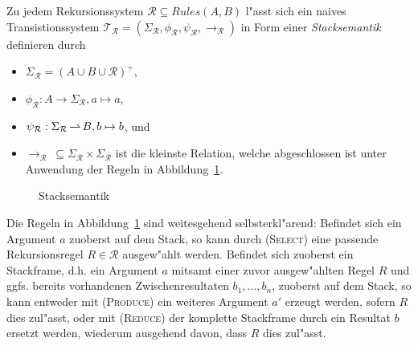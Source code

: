 \documentclass[12pt,a4paper,final]{article}
\begin{document}
Zu jedem Rekursionssystem \mbox{$\mathcal{R} \subseteq \mathit{Rules}(A,B)$} l"asst sich ein naives Transistionssystem
\mbox{$\mathcal{T}_{\mathcal{R}} = (\Sigma_{\mathcal{R}},\phi_{\mathcal{R}},\psi_{\mathcal{R}},\rightarrow_{\mathcal{R}} )$}
in Form einer \emph{Stacksemantik} definieren durch
\begin{itemize}
\item $\Sigma_{\mathcal{R}} = (A \cup B \cup \mathcal{R})^+$,
\item $\phi_{\mathcal{R}}: A \to \Sigma_{\mathcal{R}}, a \mapsto a$,
\item $\psi_{\mathcal{R}}: \Sigma_{\mathcal{R}} \operatorname{\rightharpoonup} B, b \mapsto b$, und
\item $\rightarrow_{\mathcal{R}}\ \subseteq \Sigma_{\mathcal{R}} \times \Sigma_{\mathcal{R}}$ ist die kleinste
  Relation, welche abgeschlossen ist unter Anwendung der Regeln in Abbildung~\ref{fig:Stacksemantik}.
\end{itemize}
\begin{figure}[htb]
  \centering
  \caption{Stacksemantik}
  \label{fig:Stacksemantik}
\end{figure}
Die Regeln in Abbildung~\ref{fig:Stacksemantik} sind weitesgehend selbsterkl"arend: Befindet
sich ein Argument $a$ zuoberst auf dem Stack, so kann durch \textsc{(Select)} eine
passende Rekursionsregel \mbox{$R \in \mathcal{R}$} ausgew"ahlt werden. Befindet sich zuoberst
ein Stackframe, d.h. ein Argument $a$ mitsamt einer zuvor ausgew"ahlten Regel $R$ und ggfs.\xspace
bereits vorhandenen Zwischenresultaten \mbox{$b_1,\ldots,b_n$}, zuoberst auf dem Stack, so
kann entweder mit \textsc{(Produce)} ein weiteres Argument $a'$ erzeugt werden, sofern $R$ dies
zul"asst, oder mit \textsc{(Reduce)} der komplette Stackframe durch ein Resultat $b$ ersetzt
werden, wiederum ausgehend davon, dass $R$ dies zul"asst.
\end{document}
